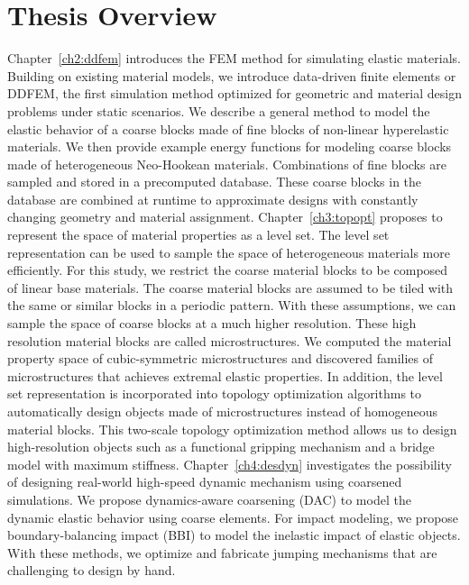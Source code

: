 \section{Thesis Overview}\label{ch1:desc}
Chapter~\ref{ch2:ddfem} introduces the FEM method for simulating elastic materials.
Building on existing material models, we introduce data-driven finite elements or DDFEM,
the first simulation method optimized for geometric and material design problems under static scenarios.
We describe a general method to model the elastic behavior of a coarse blocks made of fine blocks of non-linear hyperelastic materials.
We then provide example energy functions for modeling coarse blocks made of heterogeneous Neo-Hookean materials.
Combinations of fine blocks are sampled and stored in a precomputed database.
These coarse blocks in the database are combined at runtime to approximate designs with constantly changing geometry and material assignment.
Chapter~\ref{ch3:topopt} proposes to represent the space of material properties as a level set.
The level set representation can be used to sample the space of heterogeneous materials more efficiently.
For this study, we restrict the coarse material blocks to be composed of linear base materials.
The coarse material blocks are assumed to be tiled with the same or similar blocks in a periodic pattern.
With these assumptions, we can sample the space of coarse blocks at a much higher resolution.
These high resolution material blocks are called microstructures.
We computed the material property space of cubic-symmetric microstructures and discovered families of microstructures that achieves extremal elastic properties.
In addition, the level set representation is incorporated into topology optimization algorithms to automatically design objects made of microstructures instead of homogeneous material blocks.
This two-scale topology optimization method allows us to design high-resolution objects such as a functional gripping mechanism and a bridge model with maximum stiffness.
Chapter~\ref{ch4:desdyn} investigates the possibility of designing real-world high-speed dynamic mechanism using coarsened simulations.
We propose dynamics-aware coarsening (DAC) to model the dynamic elastic behavior using coarse elements.
For impact modeling, we propose boundary-balancing impact (BBI) to model the inelastic impact of elastic objects.
With these methods, we optimize and fabricate jumping mechanisms that are challenging to design by hand.
